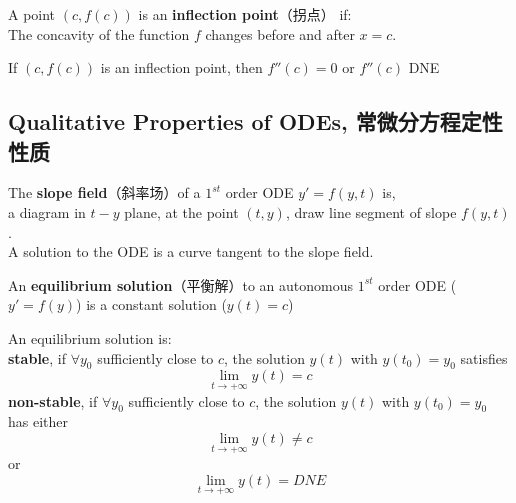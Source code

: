 \begin{definition}
    A point $(c, f(c))$ is an \textbf{inflection point}（拐点） if: \\
    The concavity of the function $f$ changes before and after $x=c$.
\end{definition}
\begin{proposition}
    If $(c, f(c))$ is an inflection point, then $f''(c) = 0$ or $f''(c)$ DNE
\end{proposition}

\subsection{Qualitative Properties of ODEs, 常微分方程定性性质}
\begin{definition}
    The \textbf{slope field}（斜率场）of a $1^{st}$ order ODE $y'=f(y, t)$ is, \\
    a diagram in $t-y$ plane, at the point $(t, y)$, draw line segment of slope $f(y, t)$. \\
    A solution to the ODE is a curve tangent to the slope field.
\end{definition}
\begin{definition}
    An \textbf{equilibrium solution}（平衡解）to an autonomous $1^{st}$ order ODE ($y'=f(y)$) is a constant solution ($y(t) = c$)
\end{definition}
\begin{definition}
    An equilibrium solution is: \\
    \textbf{stable}, if $\forall y_0$ sufficiently close to $c$, the solution $y(t)$ with $y(t_0) = y_0$ satisfies
    $$\lim_{t \to +\infty} y(t) = c$$
    \textbf{non-stable}, if $\forall y_0$ sufficiently close to $c$, the solution $y(t)$ with $y(t_0) = y_0$ has either
    $$\lim_{t \to +\infty} y(t) \ne c$$
    or
    $$\lim_{t \to +\infty} y(t) = DNE$$
\end{definition}
\newpage